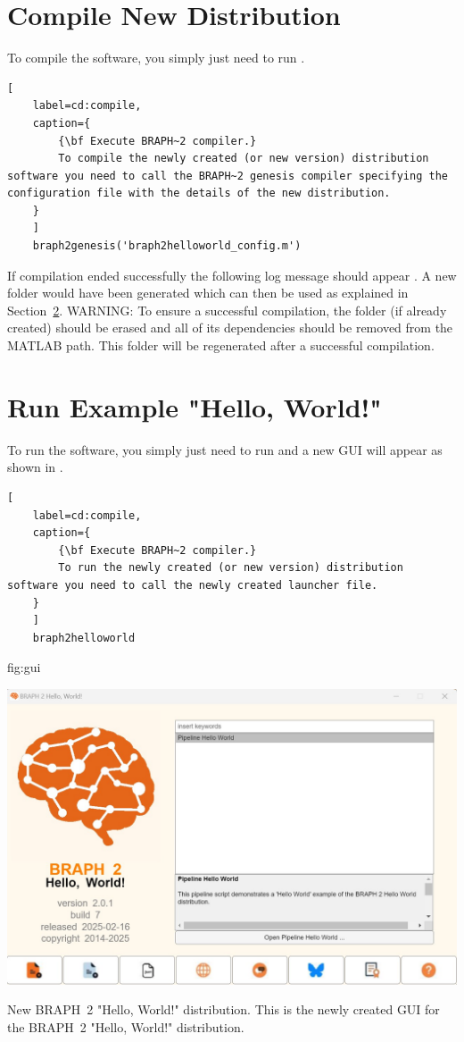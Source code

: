 \documentclass{tufte-handout}
\begin{document}
\clearpage
\section{Compile New Distribution}

To compile the software, you simply just need to run .

\begin{lstlisting}[
	label=cd:compile,
	caption={
		{\bf Execute BRAPH~2 compiler.}
		To compile the newly created (or new version) distribution software you need to call the BRAPH~2 genesis compiler specifying the configuration file with the details of the new distribution.
	}
	]
 	braph2genesis('braph2helloworld_config.m')
\end{lstlisting}

If compilation ended successfully the following log message should appear . A new  folder would have been generated which can then be used as explained in Section~\ref{sec:example}. WARNING: To ensure a successful compilation, the folder  (if already created) should be erased and all of its dependencies should be removed from the MATLAB path. This folder will be regenerated after a successful compilation.


\section{Run Example "Hello, World!"}
\label{sec:example}

To run the software, you simply just need to run  and a new GUI will appear as shown in .

\begin{lstlisting}[
	label=cd:compile,
	caption={
		{\bf Execute BRAPH~2 compiler.}
		To run the newly created (or new version) distribution software you need to call the newly created launcher file.
	}
	]
	braph2helloworld
\end{lstlisting}


{fig:gui}
{\centerline{\includegraphics{fig02.jpg}}}
{New BRAPH~2 "Hello, World!" distribution.}
{
	This is the newly created GUI for the BRAPH~2 "Hello, World!" distribution.
}
\end{document}
